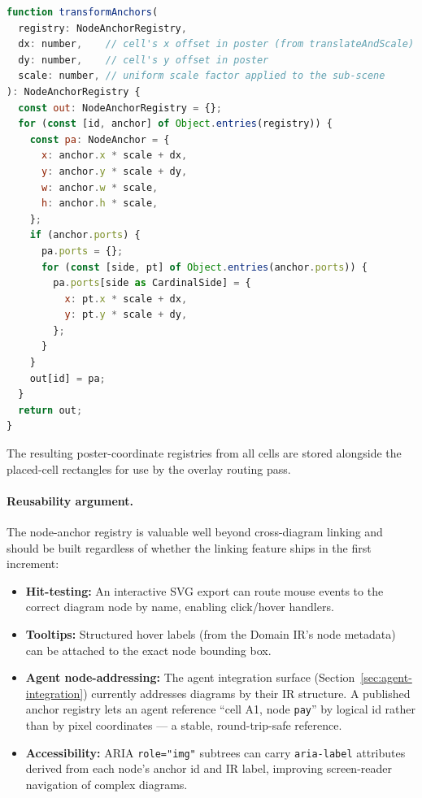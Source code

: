 \begin{lstlisting}[language=javascript,caption={Anchor transformation to poster coordinates (pseudo-code)}]
function transformAnchors(
  registry: NodeAnchorRegistry,
  dx: number,    // cell's x offset in poster (from translateAndScale)
  dy: number,    // cell's y offset in poster
  scale: number, // uniform scale factor applied to the sub-scene
): NodeAnchorRegistry {
  const out: NodeAnchorRegistry = {};
  for (const [id, anchor] of Object.entries(registry)) {
    const pa: NodeAnchor = {
      x: anchor.x * scale + dx,
      y: anchor.y * scale + dy,
      w: anchor.w * scale,
      h: anchor.h * scale,
    };
    if (anchor.ports) {
      pa.ports = {};
      for (const [side, pt] of Object.entries(anchor.ports)) {
        pa.ports[side as CardinalSide] = {
          x: pt.x * scale + dx,
          y: pt.y * scale + dy,
        };
      }
    }
    out[id] = pa;
  }
  return out;
}
\end{lstlisting}

The resulting poster-coordinate registries from all cells are stored alongside
the placed-cell rectangles for use by the overlay routing pass.

\paragraph{Reusability argument.}

The node-anchor registry is valuable well beyond cross-diagram linking and
should be built regardless of whether the linking feature ships in the first
increment:

\begin{itemize}
  \item \textbf{Hit-testing:} An interactive SVG export can route mouse events
        to the correct diagram node by name, enabling click/hover handlers.
  \item \textbf{Tooltips:} Structured hover labels (from the Domain IR's node
        metadata) can be attached to the exact node bounding box.
  \item \textbf{Agent node-addressing:} The agent integration surface
        (Section~\ref{sec:agent-integration}) currently addresses diagrams by
        their IR structure.  A published anchor registry lets an agent
        reference ``cell A1, node \texttt{pay}'' by logical id rather than by
        pixel coordinates --- a stable, round-trip-safe reference.
  \item \textbf{Accessibility:} ARIA \texttt{role="img"} subtrees can carry
        \texttt{aria-label} attributes derived from each node's anchor id and
        IR label, improving screen-reader navigation of complex diagrams.
\end{itemize}

